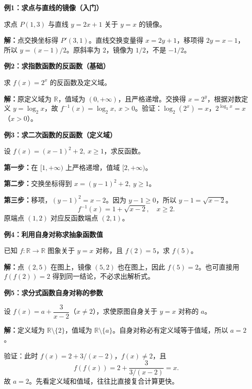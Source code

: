 \clearpage
\begin{examplebox}
\textbf{\textcolor{CExample}{例1：求点与直线的镜像（入门）}}


求点 $P(1,3)$ 与直线 $y=2x+1$ 关于 $y=x$ 的镜像。

\textbf{解：}点交换坐标得 $P'(3,1)$。直线交换变量得 $x=2y+1$，移项得 $2y=x-1$，所以 $\boxed{y=(x-1)/2}$。原斜率为 $2$，镜像为 $1/2$，不是 $-1/2$。
\end{examplebox}
\clearpage
\begin{examplebox}
\textbf{\textcolor{CExample}{例2：求指数函数的反函数（基础）}}


求 $f(x)=2^x$ 的反函数及定义域。

\textbf{解：}原定义域为 $\mathbb R$，值域为 $(0,+\infty)$，且严格递增。交换得 $x=2^y$，根据对数定义 $y=\log_2 x$，故 $\boxed{f^{-1}(x)=\log_2 x,\ x>0}$。验证：$\log_2(2^x)=x$，$2^{\log_2 x}=x$（$x>0$）。
\end{examplebox}
\clearpage
\begin{examplebox}
\textbf{\textcolor{CExample}{例3：求二次函数的反函数（定义域）}}


设 $f(x)=(x-1)^2+2,\ x\ge1$，求反函数。

\textbf{第一步：}在 $[1,+\infty)$ 上严格递增，值域 $[2,+\infty)$。

\textbf{第二步：}交换坐标得到 $x=(y-1)^2+2,\ y\ge1$。

\textbf{第三步：}移项，$(y-1)^2=x-2$。因为 $y-1\ge0$，所以 $y-1=\sqrt{x-2}$。
\[
\boxed{f^{-1}(x)=1+\sqrt{x-2},\quad x\ge2}.
\]
原端点 $(1,2)$ 对应反函数端点 $(2,1)$。
\end{examplebox}
\clearpage
\begin{examplebox}
\textbf{\textcolor{CExample}{例4：利用自身对称求抽象函数值}}


已知 $f:\mathbb R\to\mathbb R$ 图象关于 $y=x$ 对称，且 $f(2)=5$，求 $f(5)$。

\textbf{解：}点 $(2,5)$ 在图上，镜像 $(5,2)$ 也在图上，因此 $\boxed{f(5)=2}$。也可直接用 $f(f(2))=2$ 得到同一结论，不必求出解析式。
\end{examplebox}
\clearpage
\begin{examplebox}
\textbf{\textcolor{CExample}{例5：求分式函数自身对称的参数}}


设 $f(x)=a+\dfrac{3}{x-2}$（$x\ne2$），求使原图自身关于 $y=x$ 对称的 $a$。

\textbf{解：}定义域为 $\mathbb R\setminus\{2\}$，值域为 $\mathbb R\setminus\{a\}$。自身对称必有定义域等于值域，所以 $a=2$。

验证：此时 $f(x)=2+3/(x-2)$，$f(x)\ne2$，且
\[
 f(f(x))=2+\frac{3}{3/(x-2)}=x.
\]
故 $\boxed{a=2}$。先看定义域和值域，往往比直接复合计算更快。
\end{examplebox}
